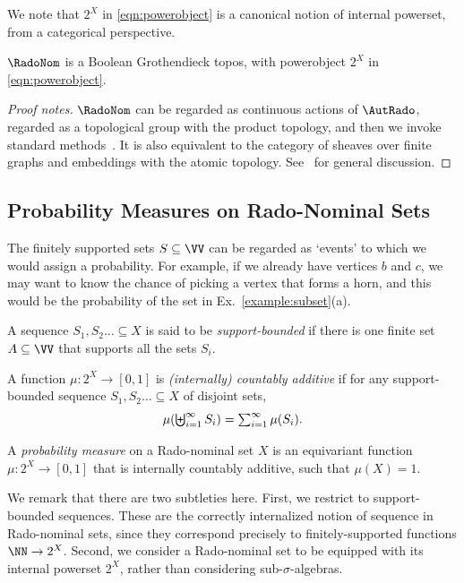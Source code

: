      We note that $2^X$ in \eqref{eqn:powerobject} is a canonical
      notion of internal powerset, from a categorical perspective.
\begin{proposition}\label{prop:radonom-topos}
$\RadoNom$ is a Boolean Grothendieck topos, with powerobject $2^X$ in \eqref{eqn:powerobject}. 
\end{proposition}
\begin{proof}[Proof notes]
  $\RadoNom$ can be regarded as continuous actions of $\AutRado$, regarded as a topological group with the product topology, and then we invoke standard methods~\cite[Ex.~A2.1.6]{elephant}. It is also equivalent to the category of sheaves over finite graphs and embeddings with the atomic topology. See~\cite{caramello-fraisse,caramello-toposic-galois} for general discussion.
\end{proof}

      \subsection{Probability Measures on Rado-Nominal Sets}\label{sec:rado-prob}
      The finitely supported sets $S\subseteq \VV$ can be regarded as
      `events' to which we would assign a probability. For example,
      if we already have vertices $b$ and $c$, we may want to know the
      chance
      of picking a vertex that forms a horn, and this would be
      the probability of the set in Ex.~\ref{example:subset}(a).
      \begin{definition}\label{def:probability}
        A sequence $S_1,S_2\dots \subseteq X$ is said to be
        \emph{support-bounded} if there is one finite set $A\subseteq\VV$ that
        supports all the sets $S_i$.

        A function $\mu:2^X\to[0,1]$ is \emph{(internally)
          countably additive} if for any
        support-bounded sequence $S_1,S_2\dots \subseteq X$ of disjoint sets, 
        \[\textstyle
          \mu(\biguplus_{i=1}^\infty S_i)=\sum_{i=1}^\infty\mu(S_i)\text.
        \]
        
        A \emph{probability measure} on a Rado-nominal set $X$ is an equivariant function
        $\mu:2^X\to [0,1]$ that is internally countably additive, such that $\mu(X) = 1$. \end{definition}
      We remark that there are two subtleties here. First,
      we restrict to support-bounded sequences. These are the
      correctly internalized notion of sequence in Rado-nominal
      sets,
      since they correspond precisely to finitely-supported functions $\NN\to
      2^X$.
      Second, we consider a Rado-nominal set to be equipped with its internal powerset $2^X$, 
      rather than considering 
      sub-$\sigma$-algebras.

